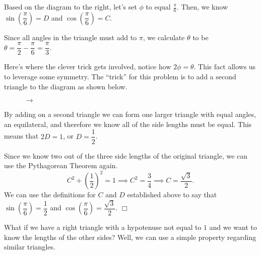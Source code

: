 \documentclass[../book.tex]{subfiles}
\begin{document}
\begin{solution}
Based on the diagram to the right, let's set $\phi$ to equal $\frac{\pi}{6}$. Then, we know $\sin\left(\dfrac{\pi}{6}\right)=D$ and $\cos\left(\dfrac{\pi}{6}\right)=C$.

Since all angles in the triangle must add to $\pi$, we calculate $\theta$ to be $\theta=\dfrac{\pi}{2}-\dfrac{\pi}{6}=\dfrac{\pi}{3}.$

Here's where the clever trick gets involved, notice how $2\phi=\theta$. This fact allows us to leverage some symmetry. The “trick” for this problem is to add a second triangle to the diagram as shown below.
\begin{figure}[!ht]
    \centering
     $\to$ 
\end{figure}

By adding on a second triangle we can form one larger triangle with equal angles, an equilateral, and therefore we know all of the side lengths must be equal. This means that $2D=1$, or $D=\dfrac{1}{2}$.

Since we know two out of the three side lengths of the original triangle, we can use the Pythagorean Theorem again. $$C^2+\left(\dfrac{1}{2}\right)^2=1 \implies C^2=\dfrac{3}{4} \implies C=\dfrac{\sqrt{3}}{2}.$$ We can use the definitions for $C$ and $D$ established above to say that $\sin\left(\dfrac{\pi}{6}\right)=\dfrac{1}{2}$ and $\cos\left(\dfrac{\pi}{6}\right)=\dfrac{\sqrt{3}}{2}$. $\Box$
\end{solution}
What if we have a right triangle with a hypotenuse not equal to $1$ and we want to know the lengths of the other sides? Well, we can use a simple property regarding similar triangles.
\end{document}
